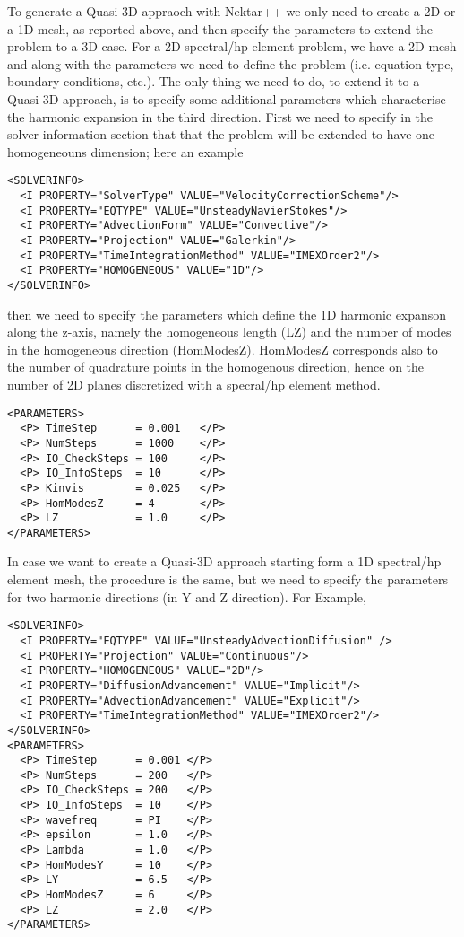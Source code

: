 To generate a Quasi-3D appraoch with Nektar++ we only need to create a 2D or a 1D mesh, as reported above, and then specify the parameters to extend the problem to a 3D case. For a 2D spectral/hp element problem, we have a 2D mesh and along with the parameters we need to define the problem (i.e. equation type, boundary conditions, etc.). The only thing we need to do, to extend it to a Quasi-3D approach, is to specify some additional parameters which characterise the harmonic expansion in the third direction. First we need to specify in the solver information section that that the problem will be extended to have one homogeneouns dimension; here an example
\begin{lstlisting}[style=XMLStyle]
<SOLVERINFO>
  <I PROPERTY="SolverType" VALUE="VelocityCorrectionScheme"/>
  <I PROPERTY="EQTYPE" VALUE="UnsteadyNavierStokes"/>
  <I PROPERTY="AdvectionForm" VALUE="Convective"/>
  <I PROPERTY="Projection" VALUE="Galerkin"/>
  <I PROPERTY="TimeIntegrationMethod" VALUE="IMEXOrder2"/>
  <I PROPERTY="HOMOGENEOUS" VALUE="1D"/>
</SOLVERINFO>
\end{lstlisting}
then we need to specify the parameters which define the 1D harmonic expanson along the z-axis, namely the homogeneous length (LZ) and the number of modes in the homogeneous direction (HomModesZ). HomModesZ corresponds also to the number of quadrature points in the homogenous direction, hence on the number of 2D planes discretized with a specral/hp element method.
\begin{lstlisting}[style=XMLStyle]
<PARAMETERS>
  <P> TimeStep      = 0.001   </P>
  <P> NumSteps      = 1000    </P>
  <P> IO_CheckSteps = 100     </P>
  <P> IO_InfoSteps  = 10      </P>
  <P> Kinvis        = 0.025   </P>
  <P> HomModesZ     = 4       </P>
  <P> LZ            = 1.0     </P>
</PARAMETERS>
\end{lstlisting}
In case we want to create a Quasi-3D approach starting form a 1D spectral/hp element mesh, the procedure is the same, but we need to specify the parameters for two harmonic directions (in Y and Z direction). For Example,
\begin{lstlisting}[style=XMLStyle]
<SOLVERINFO>
  <I PROPERTY="EQTYPE" VALUE="UnsteadyAdvectionDiffusion" />
  <I PROPERTY="Projection" VALUE="Continuous"/>
  <I PROPERTY="HOMOGENEOUS" VALUE="2D"/>
  <I PROPERTY="DiffusionAdvancement" VALUE="Implicit"/>
  <I PROPERTY="AdvectionAdvancement" VALUE="Explicit"/>
  <I PROPERTY="TimeIntegrationMethod" VALUE="IMEXOrder2"/>
</SOLVERINFO>
<PARAMETERS>
  <P> TimeStep      = 0.001 </P>
  <P> NumSteps      = 200   </P>
  <P> IO_CheckSteps = 200   </P>
  <P> IO_InfoSteps  = 10    </P>
  <P> wavefreq      = PI    </P>
  <P> epsilon       = 1.0   </P>
  <P> Lambda        = 1.0   </P>
  <P> HomModesY     = 10    </P>
  <P> LY            = 6.5   </P>
  <P> HomModesZ     = 6     </P>
  <P> LZ            = 2.0   </P>
</PARAMETERS>
\end{lstlisting}
